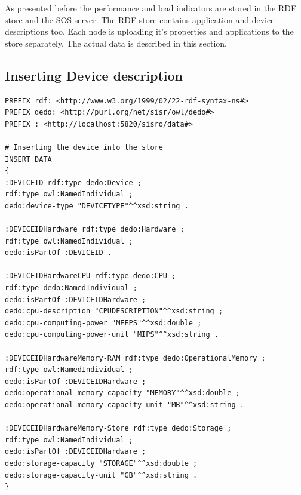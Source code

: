 As presented before the performance and load indicators are stored in the RDF store and the SOS server. The RDF store contains application and device descriptions too. Each node is uploading it's properties and applications to the store separately. The actual data is described in this section.

\subsection{Inserting Device description}


\begin{lstlisting}[caption={Template for Device information\label{lst:tempdev}}]
PREFIX rdf: <http://www.w3.org/1999/02/22-rdf-syntax-ns#>
PREFIX dedo: <http://purl.org/net/sisr/owl/dedo#>
PREFIX : <http://localhost:5820/sisro/data#>

# Inserting the device into the store
INSERT DATA
{ 
:DEVICEID rdf:type dedo:Device ;
rdf:type owl:NamedIndividual ;
dedo:device-type "DEVICETYPE"^^xsd:string .

:DEVICEIDHardware rdf:type dedo:Hardware ;
rdf:type owl:NamedIndividual ;
dedo:isPartOf :DEVICEID .

:DEVICEIDHardwareCPU rdf:type dedo:CPU ;
rdf:type dedo:NamedIndividual ;
dedo:isPartOf :DEVICEIDHardware ;
dedo:cpu-description "CPUDESCRIPTION"^^xsd:string ;
dedo:cpu-computing-power "MEEPS"^^xsd:double ;
dedo:cpu-computing-power-unit "MIPS"^^xsd:string .

:DEVICEIDHardwareMemory-RAM rdf:type dedo:OperationalMemory ;
rdf:type owl:NamedIndividual ;
dedo:isPartOf :DEVICEIDHardware ;
dedo:operational-memory-capacity "MEMORY"^^xsd:double ;
dedo:operational-memory-capacity-unit "MB"^^xsd:string .

:DEVICEIDHardwareMemory-Store rdf:type dedo:Storage ;
rdf:type owl:NamedIndividual ;
dedo:isPartOf :DEVICEIDHardware ;
dedo:storage-capacity "STORAGE"^^xsd:double ;
dedo:storage-capacity-unit "GB"^^xsd:string .
} 
\end{lstlisting}